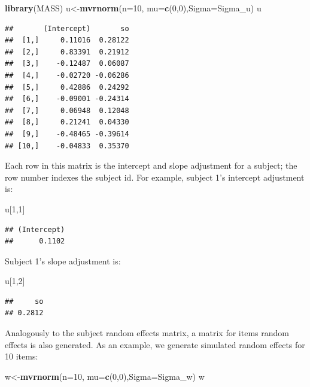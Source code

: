 \documentclass[12pt,]{krantz}
\newenvironment{Shaded}{\begin{snugshade}}{\end{snugshade}}
\newcommand{\DataTypeTok}[1]{\textcolor[rgb]{0.13,0.29,0.53}{#1}}
\newcommand{\DecValTok}[1]{\textcolor[rgb]{0.00,0.00,0.81}{#1}}
\newcommand{\KeywordTok}[1]{\textcolor[rgb]{0.13,0.29,0.53}{\textbf{#1}}}
\newcommand{\NormalTok}[1]{#1}
\begin{document}
\begin{Shaded}
\begin{Highlighting}[]
\KeywordTok{library}\NormalTok{(MASS)}
\NormalTok{u<-}\KeywordTok{mvrnorm}\NormalTok{(}\DataTypeTok{n=}\DecValTok{10}\NormalTok{,}
             \DataTypeTok{mu=}\KeywordTok{c}\NormalTok{(}\DecValTok{0}\NormalTok{,}\DecValTok{0}\NormalTok{),}\DataTypeTok{Sigma=}\NormalTok{Sigma_u)}
\NormalTok{u}
\end{Highlighting}
\end{Shaded}

\begin{verbatim}
##       (Intercept)       so
##  [1,]     0.11016  0.28122
##  [2,]     0.83391  0.21912
##  [3,]    -0.12487  0.06087
##  [4,]    -0.02720 -0.06286
##  [5,]     0.42886  0.24292
##  [6,]    -0.09001 -0.24314
##  [7,]     0.06948  0.12048
##  [8,]     0.21241  0.04330
##  [9,]    -0.48465 -0.39614
## [10,]    -0.04833  0.35370
\end{verbatim}

Each row in this matrix is the intercept and slope adjustment for a subject; the row number indexes the subject id. For example, subject 1's intercept adjustment is:

\begin{Shaded}
\begin{Highlighting}[]
\NormalTok{u[}\DecValTok{1}\NormalTok{,}\DecValTok{1}\NormalTok{]}
\end{Highlighting}
\end{Shaded}

\begin{verbatim}
## (Intercept) 
##      0.1102
\end{verbatim}

Subject 1's slope adjustment is:

\begin{Shaded}
\begin{Highlighting}[]
\NormalTok{u[}\DecValTok{1}\NormalTok{,}\DecValTok{2}\NormalTok{]}
\end{Highlighting}
\end{Shaded}

\begin{verbatim}
##     so 
## 0.2812
\end{verbatim}

Analogously to the subject random effects matrix, a matrix for items random effects is also generated. As an example, we generate simulated random effects for 10 items:

\begin{Shaded}
\begin{Highlighting}[]
\NormalTok{w<-}\KeywordTok{mvrnorm}\NormalTok{(}\DataTypeTok{n=}\DecValTok{10}\NormalTok{,}
             \DataTypeTok{mu=}\KeywordTok{c}\NormalTok{(}\DecValTok{0}\NormalTok{,}\DecValTok{0}\NormalTok{),}\DataTypeTok{Sigma=}\NormalTok{Sigma_w)}
\NormalTok{w}
\end{Highlighting}
\end{Shaded}
\end{document}
